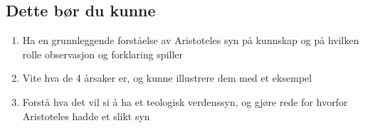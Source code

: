 \documentclass[11pt, a4paper]{article}
\begin{document}
\subsection{Dette bør du kunne}

\begin{enumerate}
    \item Ha en grunnleggende forståelse av Aristoteles syn på kunnskap og på hvilken rolle observasjon og forklaring spiller
    \item Vite hva de 4 årsaker er, og kunne illustrere dem med et eksempel
    \item Forstå hva det vil si å ha et teologisk verdenssyn, og gjøre rede for hvorfor Aristoteles hadde et slikt syn
\end{enumerate}
\end{document}
